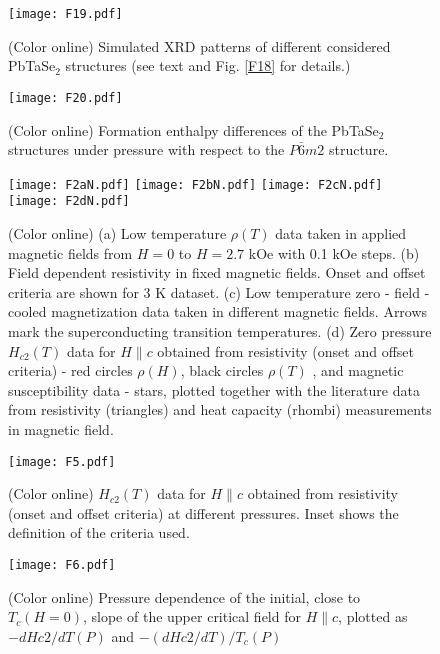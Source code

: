 \documentclass[aps,prb,preprint,groupedaddress,showpacs,amsmath,amssymb]{revtex4}
\begin{document}
\clearpage

\begin{figure}
\begin{center}
\texttt{[image: F19.pdf]}
\end{center}
\caption{(Color online) Simulated XRD patterns of different considered PbTaSe$_2$ structures (see text and Fig. \ref{F18} for details.)} \label{F19}
\end{figure}

\clearpage

\begin{figure}
\begin{center}
\texttt{[image: F20.pdf]}
\end{center}
\caption{(Color online) Formation enthalpy differences of the PbTaSe$_2$ structures under pressure with respect to the $P\bar{6}m2$ structure.} \label{F20}
\end{figure}

\clearpage

\begin{figure}
\begin{center}
\texttt{[image: F2aN.pdf]}
\texttt{[image: F2bN.pdf]}
\texttt{[image: F2cN.pdf]}
\texttt{[image: F2dN.pdf]}
\end{center}
\caption{(Color online) (a) Low temperature $\rho(T)$ data taken in applied magnetic fields from $H = 0$ to $H = 2.7$ kOe with 0.1 kOe steps. (b) Field dependent resistivity in fixed magnetic fields. Onset and offset criteria are shown for 3 K dataset. (c) Low temperature zero - field - cooled magnetization data taken in different magnetic fields. Arrows mark the superconducting transition temperatures. (d) Zero pressure $H_{c2}(T)$ data for $H \| c$ obtained from resistivity (onset and offset criteria) - red circles $\rho(H)$, black circles $\rho(T)$ , and magnetic susceptibility data - stars, plotted together with the literature data \cite{zha16a} from resistivity (triangles) and  heat capacity (rhombi) measurements in magnetic field.} \label{F2}
\end{figure}

\clearpage

\begin{figure}
\begin{center}
\texttt{[image: F5.pdf]}
\end{center}
\caption{(Color online) $H_{c2}(T)$ data for $H \| c$ obtained from resistivity (onset and offset criteria) at different pressures. Inset shows the definition of the criteria used.} \label{F5}
\end{figure}

\clearpage

\begin{figure}
\begin{center}
\texttt{[image: F6.pdf]}
\end{center}
\caption{(Color online) Pressure dependence of the initial, close to $T_c(H=0)$,  slope of the upper critical field for $H \| c$, plotted as $-dH{c2}/dT(P)$ and  $-(dH{c2}/dT)/T_c(P)$} \label{F6}
\end{figure}
\end{document}
